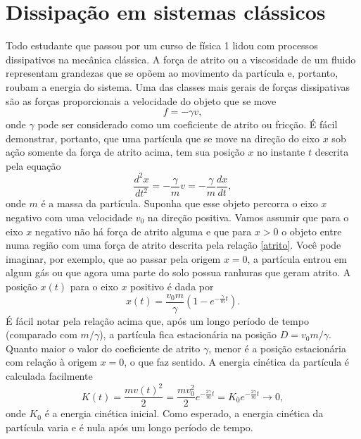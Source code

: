 \documentclass{article}
\begin{document}
\section{Dissipação em sistemas clássicos}

Todo estudante que passou por um curso de física 1 lidou com processos dissipativos na mecânica clássica. A força de atrito ou a viscosidade de um fluido representam grandezas que se opõem ao movimento da partícula e, portanto, roubam a energia do sistema. Uma das classes mais gerais de forças dissipativas são as forças proporcionais a velocidade do objeto que se move
\begin{equation}
    f = -\gamma v,
    \label{atrito}
\end{equation}
onde $\gamma$ pode ser considerado como um coeficiente de atrito ou fricção. É fácil demonstrar, portanto, que uma partícula que se move na direção do eixo $x$ sob ação somente da força de atrito acima, tem sua posição $x$ no instante $t$ descrita pela equação
\begin{equation}
    \frac{d^2 x}{dt^2} = -\frac{\gamma}{m}v = -\frac{\gamma}{m}\frac{dx}{dt},
\end{equation}
onde $m$ é a massa da partícula. Suponha que esse objeto percorra o eixo $x$ negativo com uma velocidade $v_0$ na direção positiva. Vamos assumir que para o eixo $x$ negativo não há força de atrito alguma e que para $x > 0$ o objeto entre numa região com uma força de atrito descrita pela relação \eqref{atrito}. Você pode imaginar, por exemplo, que ao passar pela origem $x = 0$, a partícula entrou em algum gás ou que agora uma parte do solo possua ranhuras que geram atrito. A posição $x(t)$ para o eixo $x$ positivo é dada por
\begin{equation}
    x(t) = \frac{v_0 m}{\gamma}\left( 1 - e^{-\frac{\gamma}{m}t} \right).
    \label{xt}
\end{equation}
É fácil notar pela relação acima que, após um longo período de tempo (comparado com $m/\gamma$), a partícula fica estacionária na posição $D = v_0 m/\gamma$. Quanto maior o valor do coeficiente de atrito $\gamma$, menor é a posição estacionária com relação à origem $x = 0$, o que faz sentido. A energia cinética da partícula é calculada facilmente
\begin{equation}
    K(t) = \frac{mv(t)^2}{2} = \frac{mv_0^2}{2}e^{-\frac{2\gamma}{m}t} = K_0 e^{-\frac{2\gamma}{m}t} \rightarrow 0,
\end{equation}
onde $K_0$ é a energia cinética inicial. Como esperado, a energia cinética da partícula varia e é nula após um longo período de tempo.
\end{document}
